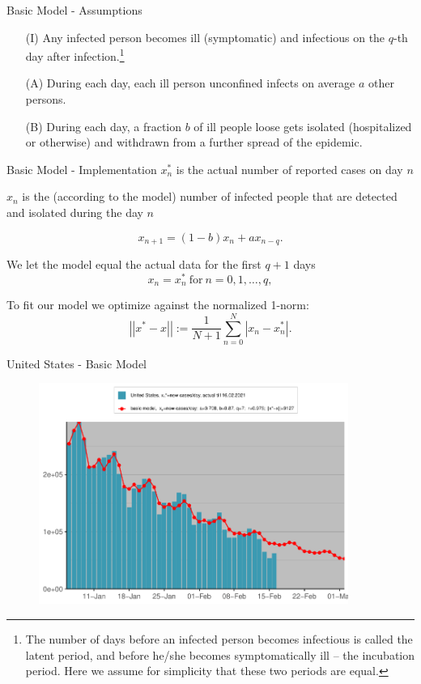 \documentclass{beamer}
\def\norm#1{\left|\left|#1\right|\right|}
\begin{document}
\begin{frame}{Basic Model - Assumptions \cite{grigor20}}
    \begin{itemize}
    \item[(I)] Any infected person becomes ill (symptomatic) and infectious on the $q$-th day after infection.\footnote{The number of days before an infected person becomes infectious is called the latent period, and before he/she becomes symptomatically ill – the incubation period. Here we assume for simplicity that these two periods are equal.}
    \item[(A)] During each day, each ill person unconfined infects on average $a$ other persons.
    \item[(B)] During each day, a fraction $b$ of ill people loose gets isolated (hospitalized or otherwise) and withdrawn from a further spread of the epidemic.
\end{itemize}
\end{frame}

\begin{frame}{Basic Model - Implementation}
$x_n^*$ is the actual number of reported cases on day $n$

$x_n$ is the (according to the model) number of infected people that are detected and isolated during the day $n$

\begin{equation*} \label{eq:xnrecurr}
    x_{n+1} = (1 - b) x_n + ax_{n-q}.
\end{equation*}

We let the model equal the actual data for the first $q+1$ days
\begin{equation*} \label{eq:xn0q}
x_n = x^*_n \ \text{for} \ n = 0, 1, \dots , q,
\end{equation*}

 To fit our model we optimize against the normalized 1-norm:
\begin{equation*}\label{eq:xnnorm}
    \norm{x^*-x}:= \frac{1}{N+1} \sum\limits_{n=0}^N |x_n-x_n^*|.
\end{equation*}
\end{frame}

\begin{frame}{United States - Basic Model}
\begin{figure}
\includegraphics[width=0.9\textwidth]{Plots/United States-basexn.pdf}
\end{figure}
\end{frame}
\end{document}
